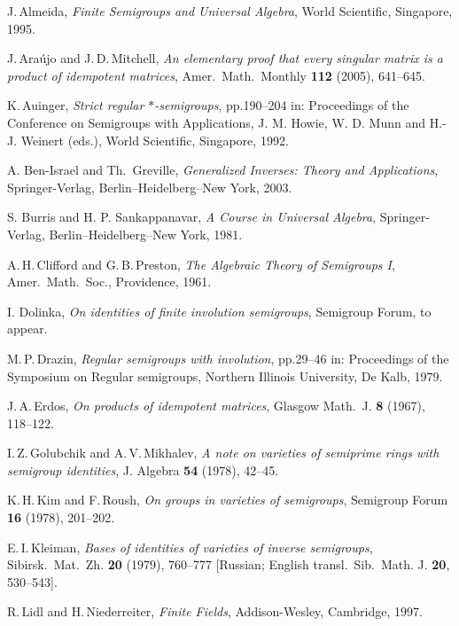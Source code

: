 \documentclass[11pt,reqno]{amsart}
\numberwithin{equation}{section}
\theoremstyle{remark}
\begin{document}
\begin{thebibliography}{99}
J.\,Almeida, \emph{Finite Semigroups and Universal Algebra}, World
Scientific, Singapore, 1995.

J.\,Ara\'ujo and J.\,D.\,Mitchell, \emph{An elementary proof that
every singular matrix is a product of idempotent matrices}, Amer.\
Math.\ Monthly \textbf{112} (2005), 641--645.

K.\,Auinger, \emph{Strict regular $*$-semigroups}, pp.190--204 in:
Proceedings of the Conference on Semigroups with Applications, J.
M. Howie, W. D. Munn and H.-J. Weinert (eds.), World Scientific,
Singapore, 1992.

A. Ben-Israel and Th.\ Greville, \emph{Generalized Inverses:
Theory and Applications}, Springer-Verlag, Berlin--Heidelberg--New
York, 2003.

S. Burris and H. P. Sankappanavar, \emph{A Course in Universal
Algebra}, Springer-Verlag, Berlin--Heidelberg--New York, 1981.

A.\,H.\,Clifford and G.\,B.\,Preston, \emph{The Algebraic Theory
of Semigroups I}, Amer.\ Math.\ Soc., Providence, 1961.

I. Dolinka, \emph{On identities of finite involution semigroups},
Semigroup Forum, to appear.

M.\,P.\,Drazin, \emph{Regular semigroups with involution},
pp.29--46 in: Proceedings of the Symposium on Regular semigroups,
Northern Illinois University, De Kalb, 1979.

J.\,A.\,Erdos, \emph{On products of idempotent matrices}, Glasgow
Math.\ J. \textbf{8} (1967), 118--122.

I.\,Z.\,Golubchik and A.\,V.\,Mikhalev, \emph{A note on varieties
of semiprime rings with semigroup identities}, J. Algebra
\textbf{54} (1978), 42--45.

K.\,H.\,Kim and F.\,Roush, \emph{On groups in varieties of
semigroups}, Semigroup Forum \textbf{ 16} (1978), 201--202.

E.\,I.\,Kleiman, \emph{Bases of identities of varieties of inverse
semigroups}, Sibirsk.\ Mat.\ Zh. \textbf{20} (1979), 760--777
[Russian; English transl.\ Sib.\ Math. J. \textbf{20}, 530--543].

R.\,Lidl and H.\,Niederreiter, \emph{Finite Fields},
Addison-Wesley, Cambridge, 1997.


\end{thebibliography}
\end{document}
